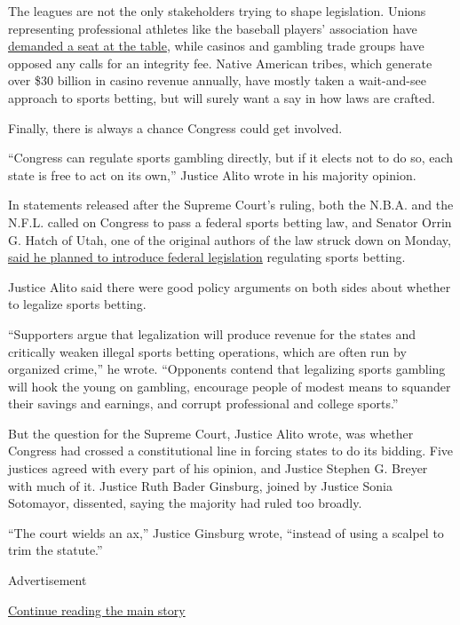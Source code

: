 The leagues are not the only stakeholders trying to shape legislation.
Unions representing professional athletes like the baseball players'
association have
\href{https://www.nflpa.com/news/players-assoc-on-sports-betting}{demanded
a seat at the table}, while casinos and gambling trade groups have
opposed any calls for an integrity fee. Native American tribes, which
generate over \$30 billion in casino revenue annually, have mostly taken
a wait-and-see approach to sports betting, but will surely want a say in
how laws are crafted.

Finally, there is always a chance Congress could get involved.

``Congress can regulate sports gambling directly, but if it elects not
to do so, each state is free to act on its own,'' Justice Alito wrote in
his majority opinion.

In statements released after the Supreme Court's ruling, both the N.B.A.
and the N.F.L. called on Congress to pass a federal sports betting law,
and Senator Orrin G. Hatch of Utah, one of the original authors of the
law struck down on Monday,
\href{https://www.hatch.senate.gov/public/index.cfm/releases?ID=02C2FD7A-6D68-40B9-8002-BA458CF4DD4F}{said
he planned to introduce federal legislation} regulating sports betting.

Justice Alito said there were good policy arguments on both sides about
whether to legalize sports betting.

``Supporters argue that legalization will produce revenue for the states
and critically weaken illegal sports betting operations, which are often
run by organized crime,'' he wrote. ``Opponents contend that legalizing
sports gambling will hook the young on gambling, encourage people of
modest means to squander their savings and earnings, and corrupt
professional and college sports.''

But the question for the Supreme Court, Justice Alito wrote, was whether
Congress had crossed a constitutional line in forcing states to do its
bidding. Five justices agreed with every part of his opinion, and
Justice Stephen G. Breyer with much of it. Justice Ruth Bader Ginsburg,
joined by Justice Sonia Sotomayor, dissented, saying the majority had
ruled too broadly.

``The court wields an ax,'' Justice Ginsburg wrote, ``instead of using a
scalpel to trim the statute.''

Advertisement

\protect\hyperlink{after-bottom}{Continue reading the main story}

